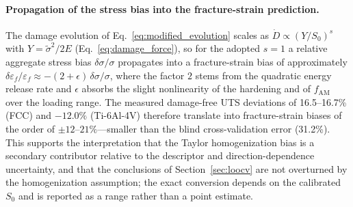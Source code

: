 \documentclass[12pt,a4paper,twocolumn]{article}
\begin{document}
\paragraph{Propagation of the stress bias into the fracture-strain prediction.} The damage evolution of Eq.~\eqref{eq:modified_evolution} scales as $\dot{D} \propto (Y/S_0)^s$ with $Y = \tilde{\sigma}^2/2E$ (Eq.~\eqref{eq:damage_force}), so for the adopted $s=1$ a relative aggregate stress bias $\delta\sigma/\sigma$ propagates into a fracture-strain bias of approximately $\delta\varepsilon_f/\varepsilon_f \approx -(2+\epsilon)\,\delta\sigma/\sigma$, where the factor $2$ stems from the quadratic energy release rate and $\epsilon$ absorbs the slight nonlinearity of the hardening and of $f_{\mathrm{AM}}$ over the loading range. The measured damage-free UTS deviations of 16.5--16.7\% (FCC) and $-12.0\%$ (Ti-6Al-4V) therefore translate into fracture-strain biases of the order of $\pm 12$--$21\%$---smaller than the blind cross-validation error (31.2\%). This supports the interpretation that the Taylor homogenization bias is a secondary contributor relative to the descriptor and direction-dependence uncertainty, and that the conclusions of Section~\ref{sec:loocv} are not overturned by the homogenization assumption; the exact conversion depends on the calibrated $S_0$ and is reported as a range rather than a point estimate.
\end{document}
